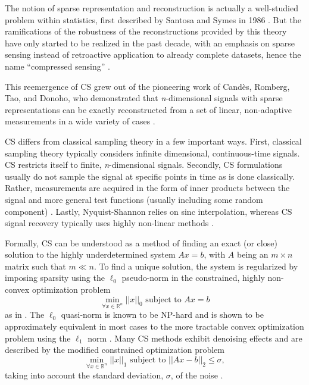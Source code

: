 \documentclass[journal]{IEEEtran}
\begin{document}
The notion of sparse representation and reconstruction is actually a well-studied problem within statistics, first described by Santosa and Symes in 1986 \cite{santosa}.  But the ramifications of the robustness of the reconstructions provided by this theory have only started to be realized in the past decade, with an emphasis on sparse sensing instead of retroactive application to already complete datasets, hence the name ``compressed sensing'' \cite{donoho}.

This reemergence of CS grew out of the pioneering work of Cand\`es, Romberg, Tao, and Donoho, who demonstrated that \emph{n}-dimensional signals with sparse representations can be exactly reconstructed from a set of linear, non-adaptive measurements in a wide variety of cases \cite{csbook,baraniuk,candes,donoho}.

CS differs from classical sampling theory in a few important ways.  First, classical sampling theory typically considers infinite dimensional, continuous-time signals.  CS restricts itself to finite, \emph{n}-dimensional signals.  Secondly, CS formulations usually do not sample the signal at specific points in time as is done classically.  Rather, measurements are acquired in the form of inner products between the signal and more general test functions (usually including some random component) \cite{csbook}.  Lastly, Nyquist-Shannon relies on sinc interpolation, whereas CS signal recovery typically uses highly non-linear methods \cite{oppenheimdigital,csbook}.


Formally, CS can be understood as a method of finding an exact (or close) solution to the highly underdetermined system $Ax = b$, with $A$ being an $m \times n$ matrix such that $m \ll n$.  To find a unique solution, the system is regularized by imposing sparsity using the $\ell_0$ pseudo-norm in the constrained, highly non-convex optimization problem $$ \min_{\forall x \in \mathbb{R}^n}  ||x||_0 \mbox{ subject to } Ax = b $$ as in \cite{convexoptimization,sparseapprox}.  The $\ell_0$ quasi-norm is known to be NP-hard and is shown to be approximately equivalent in most cases to the more tractable convex optimization problem using the $\ell_1$ norm \cite{convexoptimization}.  Many CS methods exhibit denoising effects and are described by the modified constrained optimization problem $$ \min_{\forall x \in \mathbb{R}^n} ||x||_1 \mbox{ subject to } ||Ax - b||_2 \leq \sigma, $$ taking into account the standard deviation, $\sigma$, of the noise \cite{basispursuit}.
\end{document}
